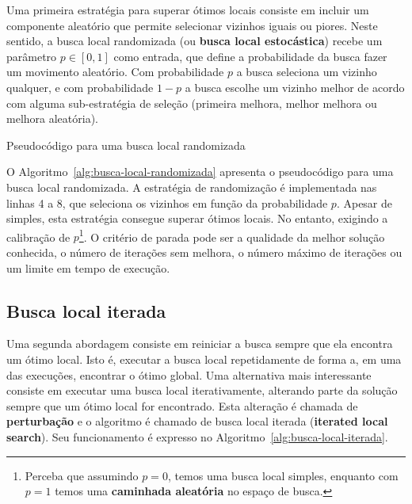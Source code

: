 Uma primeira estratégia para superar ótimos locais consiste em incluir um componente aleatório que permite selecionar vizinhos iguais ou piores. Neste sentido, a busca local randomizada (ou \textbf{busca local estocástica}) recebe um parâmetro $p \in [0,1]$ como entrada, que define a probabilidade da busca fazer um movimento aleatório. Com probabilidade $p$ a busca seleciona um vizinho qualquer, e com probabilidade $1 - p$ a busca escolhe um vizinho melhor de acordo com alguma sub-estratégia de seleção (primeira melhora, melhor melhora ou melhora aleatória).

\begin{algorithm}[h]
	\DontPrintSemicolon
	
	
	\caption{Pseudocódigo para uma busca local randomizada}
	\label{alg:busca-local-randomizada}
\end{algorithm}

O Algoritmo~\ref{alg:busca-local-randomizada} apresenta o pseudocódigo para uma busca local randomizada. A estratégia de randomização é implementada nas linhas 4 a 8, que seleciona os vizinhos em função da probabilidade $p$. Apesar de simples, esta estratégia consegue superar ótimos locais. No entanto, exigindo a calibração de $p$\footnote{Perceba que assumindo $p = 0$, temos uma busca local simples, enquanto com $p = 1$ temos uma \textbf{caminhada aleatória} no espaço de busca.}. O critério de parada pode ser a qualidade da melhor solução conhecida, o número de iterações sem melhora, o número máximo de iterações ou um limite em tempo de execução.

\subsection{Busca local iterada}

Uma segunda abordagem consiste em reiniciar a busca sempre que ela encontra um ótimo local. Isto é, executar a busca local repetidamente de forma a, em uma das execuções, encontrar o ótimo global. Uma alternativa mais interessante consiste em executar uma busca local iterativamente, alterando parte da solução sempre que um ótimo local for encontrado. Esta alteração é chamada de \textbf{perturbação} e o algoritmo é chamado de busca local iterada (\textbf{iterated local search}). Seu funcionamento é expresso no Algoritmo~\ref{alg:busca-local-iterada}.

